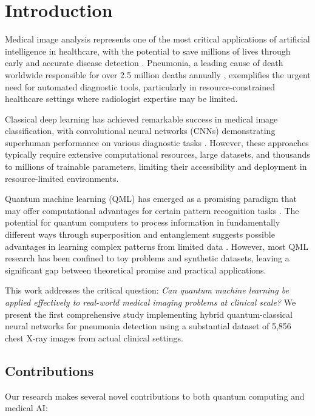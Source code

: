 \documentclass[conference]{IEEEtran}
\begin{document}
\section{Introduction}

Medical image analysis represents one of the most critical applications of artificial intelligence in healthcare, with the potential to save millions of lives through early and accurate disease detection \cite{litjens2017survey}. Pneumonia, a leading cause of death worldwide responsible for over 2.5 million deaths annually \cite{who2019pneumonia}, exemplifies the urgent need for automated diagnostic tools, particularly in resource-constrained healthcare settings where radiologist expertise may be limited.

Classical deep learning has achieved remarkable success in medical image classification, with convolutional neural networks (CNNs) demonstrating superhuman performance on various diagnostic tasks \cite{rajpurkar2017chexnet}. However, these approaches typically require extensive computational resources, large datasets, and thousands to millions of trainable parameters, limiting their accessibility and deployment in resource-limited environments.

Quantum machine learning (QML) has emerged as a promising paradigm that may offer computational advantages for certain pattern recognition tasks \cite{biamonte2017quantum}. The potential for quantum computers to process information in fundamentally different ways through superposition and entanglement suggests possible advantages in learning complex patterns from limited data \cite{schuld2015introduction}. However, most QML research has been confined to toy problems and synthetic datasets, leaving a significant gap between theoretical promise and practical applications.

This work addresses the critical question: \textit{Can quantum machine learning be applied effectively to real-world medical imaging problems at clinical scale?} We present the first comprehensive study implementing hybrid quantum-classical neural networks for pneumonia detection using a substantial dataset of 5,856 chest X-ray images from actual clinical settings.

\subsection{Contributions}

Our research makes several novel contributions to both quantum computing and medical AI:
\end{document}
